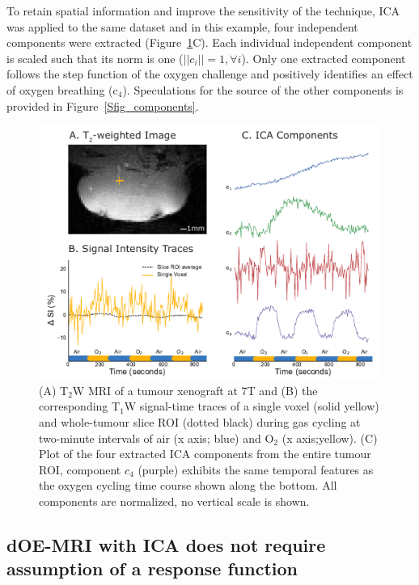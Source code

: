 To retain spatial information and improve the sensitivity of the technique, \acs{ICA} was applied to the same dataset and in this example, four independent components were extracted (Figure~\ref{technique}C). 
Each individual independent component is scaled such that its norm is one ($||c_i||=1, \forall i $).
Only one extracted component follows the step function of the oxygen challenge and positively identifies an effect of oxygen breathing (c$_4$).
Speculations for the source of the other components is provided in Figure~\ref{Sfig_components}.
\begin{figure}[htbp]
   \includegraphics[width=\textwidth]{oemri_thesis1/oemri_thesis1-images/fig1_technique.pdf} %
   \caption{(A) T$_2$W MRI of a tumour xenograft at 7T and (B) the corresponding T$_1$W signal-time traces of a single voxel (solid yellow) and whole-tumour slice ROI (dotted black) during gas cycling at two-minute intervals of air (x axis; blue) and O$_2$ (x axis;yellow).
(C) Plot of the four extracted \acs{ICA} components from the entire tumour ROI, component \textbf{$c_4$} (purple) exhibits the same temporal features as the oxygen cycling time course shown along the bottom. All components are normalized, no vertical scale is shown.}
   \label{technique}
\end{figure}

\subsection{dOE-MRI with \acs{ICA} does not require assumption of a response function}
\label{res2}

